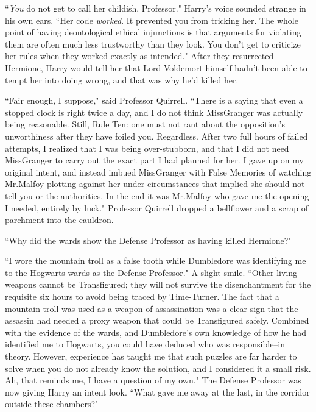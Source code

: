 ``\emph{You} do not get to call her childish, Professor." Harry's voice sounded strange in his own ears. ``Her code \emph{worked}. It prevented you from tricking her. The whole point of having deontological ethical injunctions is that arguments for violating them are often much less trustworthy than they look. You don't get to criticize her rules when they worked exactly as intended." After they resurrected Hermione, Harry would tell her that Lord Voldemort himself hadn't been able to tempt her into doing wrong, and that was why he'd killed her.

``Fair enough, I suppose," said Professor Quirrell. ``There is a saying that even a stopped clock is right twice a day, and I do not think Miss\?Granger was actually being reasonable. Still, Rule Ten: one must not rant about the opposition's unworthiness after they have foiled you. Regardless. After two full hours of failed attempts, I realized that I was being over-stubborn, and that I did not need Miss\?Granger to carry out the exact part I had planned for her. I gave up on my original intent, and instead imbued Miss\?Granger with False Memories of watching Mr.\?Malfoy plotting against her under circumstances that implied she should not tell you or the authorities. In the end it was Mr.\?Malfoy who gave me the opening I needed, entirely by luck." Professor Quirrell dropped a bellflower and a scrap of parchment into the cauldron.

``Why did the wards show the Defense Professor as having killed Hermione?"

``I wore the mountain troll as a false tooth while Dumbledore was identifying me to the Hogwarts wards as the Defense Professor." A slight smile. ``Other living weapons cannot be Transfigured; they will not survive the disenchantment for the requisite six hours to avoid being traced by Time-Turner. The fact that a mountain troll was used as a weapon of assassination was a clear sign that the assassin had needed a proxy weapon that could be Transfigured safely. Combined with the evidence of the wards, and Dumbledore's own knowledge of how he had identified me to Hogwarts, you could have deduced who was responsible\---in theory. However, experience has taught me that such puzzles are far harder to solve when you do not already know the solution, and I considered it a small risk. Ah, that reminds me, I have a question of my own." The Defense Professor was now giving Harry an intent look. ``What gave me away at the last, in the corridor outside these chambers?"

